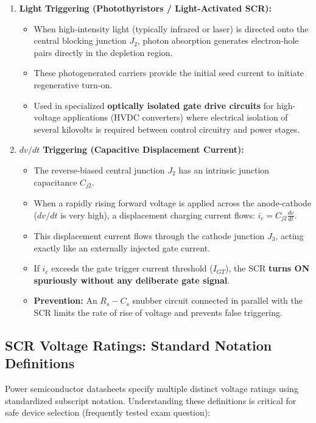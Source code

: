 \documentclass[11pt,a4paper]{article}
\begin{document}
\begin{conceptbox}
\begin{enumerate}[leftmargin=*]
  \item \textbf{Light Triggering (Photothyristors / Light-Activated SCR):}
  \begin{itemize}
    \item When high-intensity light (typically infrared or laser) is directed onto the central blocking junction $J_2$, photon absorption generates electron-hole pairs directly in the depletion region.
    \item These photogenerated carriers provide the initial seed current to initiate regenerative turn-on.
    \item Used in specialized \textbf{optically isolated gate drive circuits} for high-voltage applications (HVDC converters) where electrical isolation of several kilovolts is required between control circuitry and power stages.
  \end{itemize}

  \item \textbf{$dv/dt$ Triggering (Capacitive Displacement Current):}
  \begin{itemize}
    \item The reverse-biased central junction $J_2$ has an intrinsic junction capacitance $C_{j2}$.
    \item When a rapidly rising forward voltage is applied across the anode-cathode ($dv/dt$ is very high), a displacement charging current flows: $i_c = C_{j2} \frac{dv}{dt}$.
    \item This displacement current flows through the cathode junction $J_3$, acting exactly like an externally injected gate current.
    \item If $i_c$ exceeds the gate trigger current threshold ($I_{GT}$), the SCR \textbf{turns ON spuriously without any deliberate gate signal}.
    \item \textbf{Prevention:} An $R_s-C_s$ snubber circuit connected in parallel with the SCR limits the rate of rise of voltage and prevents false triggering.
  \end{itemize}
\end{enumerate}
\end{conceptbox}

\subsection{SCR Voltage Ratings: Standard Notation Definitions}

Power semiconductor datasheets specify multiple distinct voltage ratings using standardized subscript notation. Understanding these definitions is critical for safe device selection (frequently tested exam question):
\end{document}
